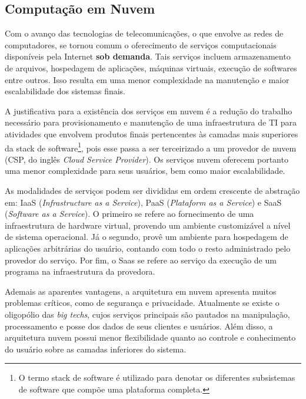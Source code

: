 \documentclass{article}
\begin{document}
\subsection{Computação em Nuvem}
Com o avanço das tecnologias de telecomunicações, o que envolve as redes de
computadores, se tornou comum o oferecimento de serviços computacionais
disponíveis pela Internet \textbf{sob demanda}. Tais serviços incluem
armazenamento de arquivos, hospedagem de aplicações, máquinas virtuais, execução
de softwares entre outros. Isso resulta em uma menor complexidade na manutenção
e maior escalabilidade dos sistemas finais.

A justificativa para a existência dos serviços em nuvem é a redução do trabalho
necessário para provisionamento e manutenção de uma infraestrutura de TI para
atividades que envolvem produtos finais pertencentes às camadas mais superiores
da stack de software\footnote{O termo stack de software é utilizado para denotar
os diferentes subsistemas de software que compõe uma plataforma completa.}, pois
esse passa a ser terceirizado a um provedor de nuvem (CSP, do inglês
\textit{Cloud Service Provider}). Os serviços nuvem oferecem portanto uma menor
complexidade para seus usuários, bem como maior escalabilidade.

As modalidades de serviços podem ser divididas em ordem crescente de abstração
em: IaaS (\textit{Infrastructure as a Service}), PaaS (\textit{Plataform as a
Service}) e SaaS (\textit{Software as a Service}). O primeiro se refere ao
fornecimento de uma infraestrutura de hardware virtual, provendo um ambiente
customizável a nível de sistema operacional. Já o segundo, provê um ambiente
para hospedagem de aplicações arbitrárias do usuário, contando com todo o resto
administrado pelo provedor do serviço. Por fim, o Saas se refere ao serviço da
execução de um programa na infraestrutura da provedora.

Ademais as aparentes vantagens, a arquitetura em nuvem apresenta muitos
problemas críticos, como de segurança e privacidade. Atualmente se existe o
oligopólio das \textit{big techs}, cujos serviços principais são pautados na
manipulação, processamento e posse dos dados de seus clientes e usuários. Além
disso, a arquitetura nuvem possui menor flexibilidade quanto ao controle e
conhecimento do usuário sobre as camadas inferiores do sistema.

\nocite{stallings}



\end{document}
